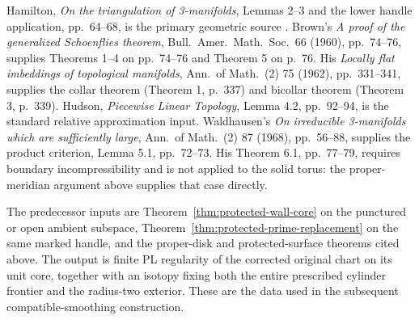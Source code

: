 Hamilton, \emph{On the triangulation of 3-manifolds}, Lemmas 2--3 and the lower
handle application, pp.~64--68, is the primary geometric source
\cite[Lemmas 2--3 and application, pp.~64--68]{Hamilton1976}.
Brown's \emph{A proof of the generalized Schoenflies theorem},
Bull.\ Amer.\ Math.\ Soc.\ 66 (1960), pp.~74--76, supplies Theorems
1--4 on pp.~74--76 and Theorem 5 on p.~76.
His \emph{Locally flat imbeddings of topological manifolds},
Ann.\ of Math.\ (2) 75 (1962), pp.~331--341, supplies the collar
theorem (Theorem 1, p.~337) and bicollar theorem (Theorem 3, p.~339).
Hudson,
\emph{Piecewise Linear Topology}, Lemma 4.2, pp.~92--94, is the standard
relative approximation input. Waldhausen's \emph{On irreducible
3-manifolds which are sufficiently large}, Ann.\ of Math.\ (2) 87
(1968), pp.~56--88, supplies the product criterion, Lemma 5.1,
pp.~72--73. His Theorem 6.1, pp.~77--79, requires boundary
incompressibility \cite[Theorem 6.1, pp.~77--79]{Waldhausen1968}
and is not applied to the solid torus: the
proper-meridian argument above supplies that case directly.

The predecessor inputs are Theorem~\ref{thm:protected-wall-core} on the
punctured or open ambient subspace, Theorem~\ref{thm:protected-prime-replacement}
on the same marked handle, and the proper-disk and protected-surface
theorems cited above. The output is finite PL regularity of the corrected
original chart on its unit core, together with an isotopy fixing both the
entire prescribed cylinder frontier and the radius-two exterior. These
are the data used in the subsequent compatible-smoothing construction.
